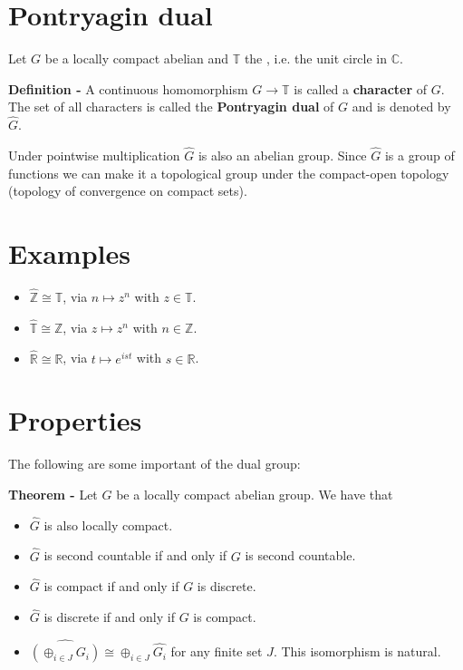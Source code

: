 \documentclass[12pt]{article}
\begin{document}
\section{Pontryagin dual}

Let $G$ be a locally compact abelian  and $\mathbb{T}$ the , i.e. the unit circle in $\mathbb{C}$.

{\bf Definition -} A continuous homomorphism $G \longrightarrow \mathbb{T}$ is called a {\bf character} of $G$. The set of all characters is called the {\bf Pontryagin dual} of $G$ and is denoted by $\hat{G}$.

Under pointwise multiplication $\hat{G}$ is also an abelian group. Since $\hat{G}$ is a group of functions we can make it a topological group under the compact-open topology (topology of convergence on compact sets).

\section{Examples}
\begin{itemize}
\item $\hat{\mathbb{Z}} \cong \mathbb{T}$, via $n \mapsto z^n$ with $z \in \mathbb{T}$.
\item $\hat{\mathbb{T}} \cong \mathbb{Z}$, via $z \mapsto z^n$ with $n \in \mathbb{Z}$.
\item $\hat{\mathbb{R}} \cong \mathbb{R}$, via $t \mapsto e^{ist}$ with $s \in \mathbb{R}$.
\end{itemize}

\section{Properties}

The following are some important  of the dual group:

{\bf Theorem -} Let $G$ be a locally compact abelian group. We have that
\begin{itemize}
\item $\hat{G}$ is also locally compact.
\item $\hat{G}$ is second countable if and only if $G$ is second countable.
\item $\hat{G}$ is compact if and only if $G$ is discrete.
\item $\hat{G}$ is discrete if and only if $G$ is compact.
\item $\widehat{(\oplus_{i \in J} G_i)} \cong \oplus_{i \in J} \hat{G_i}$ for any finite set $J$. This isomorphism is natural.
\end{itemize}
\end{document}

